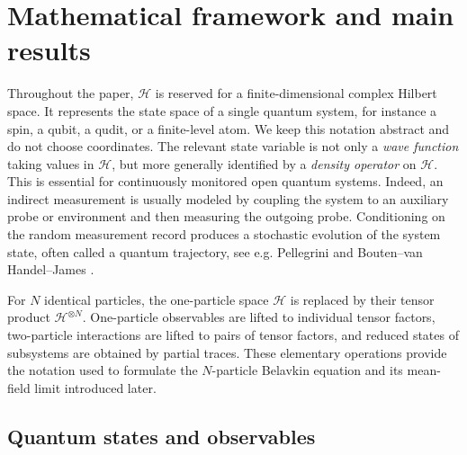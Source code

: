 \documentclass[10pt,a4paper,reqno]{amsart}
\numberwithin{equation}{section}
\theoremstyle{plain}
\theoremstyle{definition}
\theoremstyle{remark}
\newcommand{\HH}{\mathcal H}
\newcommand{\1}{\mathbf 1}
\begin{document}
\section{Mathematical framework and main results}
\label{sec:framework}


Throughout the paper, \(\HH\) is reserved for a finite-dimensional complex Hilbert
space.  It represents the state space of a single quantum system,
for instance a spin, a qubit, a qudit, or a finite-level atom.  We keep this
notation abstract and do not choose coordinates.  The relevant state variable is
not only a \emph{wave function}  taking values in $\HH$,  but more generally identified by a \emph{density operator} on \(\HH\).
This is essential for continuously monitored open quantum systems.  Indeed, an
indirect measurement is usually modeled by coupling the system to an auxiliary
probe or environment and then measuring the outgoing probe.  Conditioning on
the random measurement record produces a stochastic evolution of the system
state, often called a quantum trajectory,  see e.g. Pellegrini \cite{pellegrini2008} and Bouten--van Handel--James
\cite{bouten2007}.

For \(N\) identical particles,  the one-particle space \(\HH\) is replaced by their
tensor product
\(
 \HH^{\otimes N}.
\)
One-particle observables are lifted to individual tensor factors, two-particle
interactions are lifted to pairs of tensor factors, and reduced states of
subsystems are obtained by partial traces.  These elementary operations provide
the notation used to formulate the \(N\)-particle Belavkin equation and its
mean-field limit introduced later. 

\subsection{Quantum states and observables}
\label{subsec:states-and-composite-systems}
\end{document}
